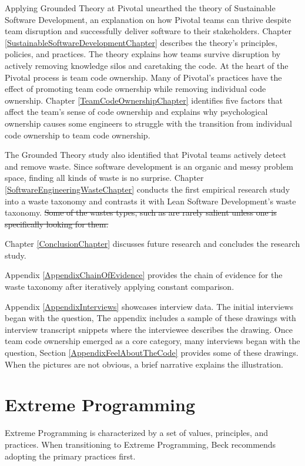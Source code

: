 Applying Grounded Theory at Pivotal unearthed the theory of Sustainable Software Development, an explanation on how Pivotal teams can thrive despite team disruption and successfully deliver software to their stakeholders. Chapter \ref{SustainableSoftwareDevelopmentChapter} describes the theory's principles, policies, and practices. The theory explains how teams survive disruption by actively removing knowledge silos and caretaking the code. At the heart of the Pivotal process is team code ownership. Many of Pivotal's practices have the effect of promoting team code ownership while removing individual code ownership. Chapter \ref{TeamCodeOwnershipChapter} identifies five factors that affect the team's sense of code ownership and explains why psychological ownership causes some engineers to struggle with the transition from individual code ownership to team code ownership. 


The Grounded Theory study also identified that Pivotal teams actively detect and remove waste. Since software development is an organic and messy problem space, finding all kinds of waste is no surprise. Chapter \ref{SoftwareEngineeringWasteChapter} conducts the first empirical research study into a waste taxonomy and contrasts it with Lean Software Development's waste taxonomy. \sout{Some of the wastes types, such as  are rarely salient unless one is specifically looking for them.}


Chapter \ref{ConclusionChapter} discusses future research and concludes the research study. 


Appendix \ref{AppendixChainOfEvidence} provides the chain of evidence for the waste taxonomy after iteratively applying constant comparison. 


Appendix \ref{AppendixInterviews} showcases interview data. The initial interviews began with the question,  The appendix includes a sample of these drawings with interview transcript snippets where the interviewee describes the drawing. Once team code ownership emerged as a core category, many interviews began with the question,  Section \ref{AppendixFeelAboutTheCode} provides some of these drawings. When the pictures are not obvious, a brief narrative explains the illustration.




\chapter{Extreme Programming}
Extreme Programming is characterized by a set of values, principles, and practices. When transitioning to Extreme Programming, Beck recommends adopting the primary practices first. 
